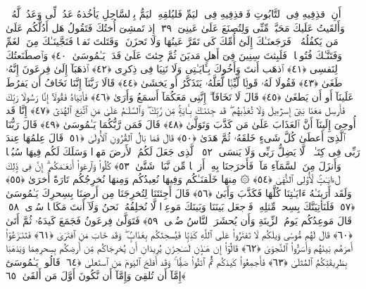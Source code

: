  أَنِ ٱقذِفِيهِ فِى ٱلتَّابُوتِ فَٱقذِفِيهِ فِى ٱليَمِّ فَليُلقِهِ ٱليَمُّ بِٱلسَّاحِلِ يَأخُذهُ عَدُوٌّۭ لِّى وَعَدُوٌّۭ لَّهُۥ ۚ وَأَلقَيتُ عَلَيكَ مَحَبَّةًۭ مِّنِّى وَلِتُصنَعَ عَلَىٰ عَينِىٓ ﴿٣٩﴾
 إِذ تَمشِىٓ أُختُكَ فَتَقُولُ هَل أَدُلُّكُم عَلَىٰ مَن يَكفُلُهُۥ ۖ فَرَجَعنَـٰكَ إِلَىٰٓ أُمِّكَ كَى تَقَرَّ عَينُهَا وَلَا تَحزَنَ ۚ وَقَتَلتَ نَفسًۭا فَنَجَّينَـٰكَ مِنَ ٱلغَمِّ وَفَتَنَّـٰكَ فُتُونًۭا ۚ فَلَبِثتَ سِنِينَ فِىٓ أَهلِ مَديَنَ ثُمَّ جِئتَ عَلَىٰ قَدَرٍۢ يَـٰمُوسَىٰ ﴿٤٠﴾
 وَٱصطَنَعتُكَ لِنَفسِى ﴿٤١﴾
 ٱذهَب أَنتَ وَأَخُوكَ بِـَٔايَـٰتِى وَلَا تَنِيَا فِى ذِكرِى ﴿٤٢﴾
 ٱذهَبَآ إِلَىٰ فِرعَونَ إِنَّهُۥ طَغَىٰ ﴿٤٣﴾
 فَقُولَا لَهُۥ قَولًۭا لَّيِّنًۭا لَّعَلَّهُۥ يَتَذَكَّرُ أَو يَخشَىٰ ﴿٤٤﴾
 قَالَا رَبَّنَآ إِنَّنَا نَخَافُ أَن يَفرُطَ عَلَينَآ أَو أَن يَطغَىٰ ﴿٤٥﴾
 قَالَ لَا تَخَافَآ ۖ إِنَّنِى مَعَكُمَآ أَسمَعُ وَأَرَىٰ ﴿٤٦﴾
 فَأتِيَاهُ فَقُولَآ إِنَّا رَسُولَا رَبِّكَ فَأَرسِل مَعَنَا بَنِىٓ إِسرَٰٓءِيلَ وَلَا تُعَذِّبهُم ۖ قَد جِئنَـٰكَ بِـَٔايَةٍۢ مِّن رَّبِّكَ ۖ وَٱلسَّلَـٰمُ عَلَىٰ مَنِ ٱتَّبَعَ ٱلهُدَىٰٓ ﴿٤٧﴾
 إِنَّا قَد أُوحِىَ إِلَينَآ أَنَّ ٱلعَذَابَ عَلَىٰ مَن كَذَّبَ وَتَوَلَّىٰ ﴿٤٨﴾
 قَالَ فَمَن رَّبُّكُمَا يَـٰمُوسَىٰ ﴿٤٩﴾
 قَالَ رَبُّنَا ٱلَّذِىٓ أَعطَىٰ كُلَّ شَىءٍ خَلقَهُۥ ثُمَّ هَدَىٰ ﴿٥٠﴾
 قَالَ فَمَا بَالُ ٱلقُرُونِ ٱلأُولَىٰ ﴿٥١﴾
 قَالَ عِلمُهَا عِندَ رَبِّى فِى كِتَـٰبٍۢ ۖ لَّا يَضِلُّ رَبِّى وَلَا يَنسَى ﴿٥٢﴾
 ٱلَّذِى جَعَلَ لَكُمُ ٱلأَرضَ مَهدًۭا وَسَلَكَ لَكُم فِيهَا سُبُلًۭا وَأَنزَلَ مِنَ ٱلسَّمَآءِ مَآءًۭ فَأَخرَجنَا بِهِۦٓ أَزوَٟجًۭا مِّن نَّبَاتٍۢ شَتَّىٰ ﴿٥٣﴾
 كُلُوا۟ وَٱرعَوا۟ أَنعَـٰمَكُم ۗ إِنَّ فِى ذَٟلِكَ لَءَايَـٰتٍۢ لِّأُو۟لِى ٱلنُّهَىٰ ﴿٥٤﴾
 ۞ مِنهَا خَلَقنَـٰكُم وَفِيهَا نُعِيدُكُم وَمِنهَا نُخرِجُكُم تَارَةً أُخرَىٰ ﴿٥٥﴾
 وَلَقَد أَرَينَـٰهُ ءَايَـٰتِنَا كُلَّهَا فَكَذَّبَ وَأَبَىٰ ﴿٥٦﴾
 قَالَ أَجِئتَنَا لِتُخرِجَنَا مِن أَرضِنَا بِسِحرِكَ يَـٰمُوسَىٰ ﴿٥٧﴾
 فَلَنَأتِيَنَّكَ بِسِحرٍۢ مِّثلِهِۦ فَٱجعَل بَينَنَا وَبَينَكَ مَوعِدًۭا لَّا نُخلِفُهُۥ نَحنُ وَلَآ أَنتَ مَكَانًۭا سُوًۭى ﴿٥٨﴾
 قَالَ مَوعِدُكُم يَومُ ٱلزِّينَةِ وَأَن يُحشَرَ ٱلنَّاسُ ضُحًۭى ﴿٥٩﴾
 فَتَوَلَّىٰ فِرعَونُ فَجَمَعَ كَيدَهُۥ ثُمَّ أَتَىٰ ﴿٦٠﴾
 قَالَ لَهُم مُّوسَىٰ وَيلَكُم لَا تَفتَرُوا۟ عَلَى ٱللَّهِ كَذِبًۭا فَيُسحِتَكُم بِعَذَابٍۢ ۖ وَقَد خَابَ مَنِ ٱفتَرَىٰ ﴿٦١﴾
 فَتَنَـٰزَعُوٓا۟ أَمرَهُم بَينَهُم وَأَسَرُّوا۟ ٱلنَّجوَىٰ ﴿٦٢﴾
 قَالُوٓا۟ إِن هَـٰذَٟنِ لَسَـٰحِرَٰنِ يُرِيدَانِ أَن يُخرِجَاكُم مِّن أَرضِكُم بِسِحرِهِمَا وَيَذهَبَا بِطَرِيقَتِكُمُ ٱلمُثلَىٰ ﴿٦٣﴾
 فَأَجمِعُوا۟ كَيدَكُم ثُمَّ ٱئتُوا۟ صَفًّۭا ۚ وَقَد أَفلَحَ ٱليَومَ مَنِ ٱستَعلَىٰ ﴿٦٤﴾
 قَالُوا۟ يَـٰمُوسَىٰٓ إِمَّآ أَن تُلقِىَ وَإِمَّآ أَن نَّكُونَ أَوَّلَ مَن أَلقَىٰ ﴿٦٥﴾
